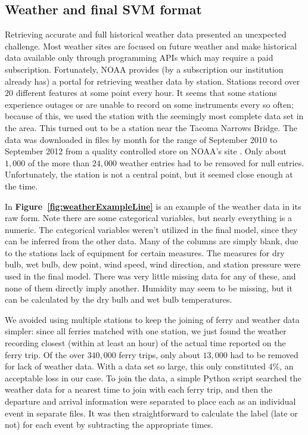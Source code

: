 \documentclass[11pt]{article} %
\begin{document}
\subsection{Weather and final SVM format}
\label{sec:data_origins}
Retrieving accurate and full historical weather data presented an unexpected 
challenge. Most weather sites are focused on future weather and make historical
data available only through programming APIs which may require a paid subscription.
Fortunately, NOAA provides (by a subscription our institution already has) a portal 
for retrieving weather data
by station. Stations record over $20$ different features at some point every hour.
It seems that some stations experience outages or are unable to record on some
instruments every so often; because of this, we used the station with the seemingly
most complete data set in the area. This turned out to be a station near the 
Tacoma Narrows Bridge. The data was downloaded in files by month for the range of
September 2010 to September 2012 from a quality controlled store on NOAA's 
site \cite{noaaWeather}. Only about $1,000$ of the more than $24,000$ weather 
entries had to be removed for null entries.  Unfortunately, 
the station is not a central point, but it seemed close enough at the time. 

In \textbf{Figure~\ref{fig:weatherExampleLine}} is an example of the weather
data in its raw form. Note there are some categorical variables, but
nearly everything is a numeric. The categorical variables weren't utilized in the
final model, since they can be inferred from the other data. Many of the columns
are simply blank, due to the stations lack of equipment for certain measures. 
The measures for dry bulb, wet bulb, dew point, wind speed, wind direction, and
station pressure were used in the final model. There was very little missing data
for any of these, and none of them directly imply another. Humidity may seem to 
be missing, but it can be calculated by the dry bulb and wet bulb temperatures.

We avoided using multiple stations to keep the joining of ferry and weather 
data simpler: since all ferries matched with one station, we just found the 
weather recording closest (within at least an hour) of the actual time reported
on the ferry trip. Of the over $340,000$ ferry trips, only about $13,000$ had to 
be removed for lack of weather data.  With a data set so large, this only 
constituted $4\%$, an acceptable loss in our case. To join the data, a simple
Python script searched the weather data for a nearest time to join with each
ferry trip, and then the departure and arrival information were separated to
place each as an individual event in separate files. It was then straightforward
to calculate the label (late or not) for each event by subtracting the appropriate
times.
\end{document}
